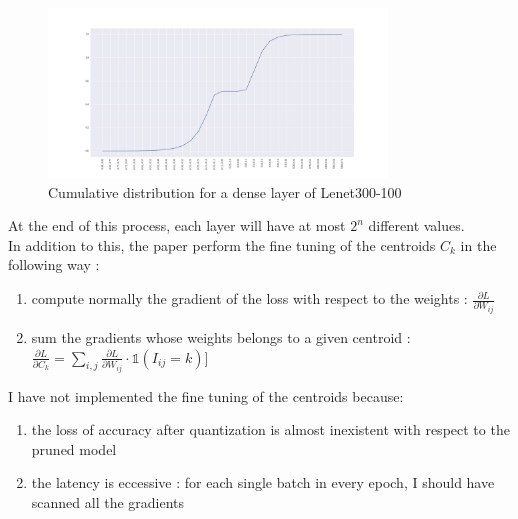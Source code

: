 \documentclass[journal]{vgtc}                %
\begin{document}
\begin{figure}[H]
	\hspace*{-1cm}
	\includegraphics[width=90mm,scale=0.7]{cdf}
	\caption{Cumulative distribution for a dense layer of Lenet300-100 }
\end{figure}

At the end of this process, each layer will have at most $2^{n}$ different values.\\In addition to this, the paper perform the fine tuning of the centroids $C_k$ in the following way :
\begin{enumerate}
\item compute normally the gradient of the loss with respect to the weights : $\frac{\partial L}{\partial W_{ij}}$
\item sum the gradients whose weights belongs to a given centroid : $\frac{\partial L}{\partial C_{k}}=\sum\limits_{i,j}\frac{\partial L }{\partial W_{ij}}\cdot \mathbb{1}(I_{ij}=k) ]$
\end{enumerate}
I have not implemented the fine tuning of the centroids because:
\begin{enumerate}
\item the loss of accuracy after quantization is almost inexistent with respect to the pruned model
\item the latency is eccessive : for each single batch in every epoch, I should have scanned all the gradients
\end{enumerate}
\end{document}
